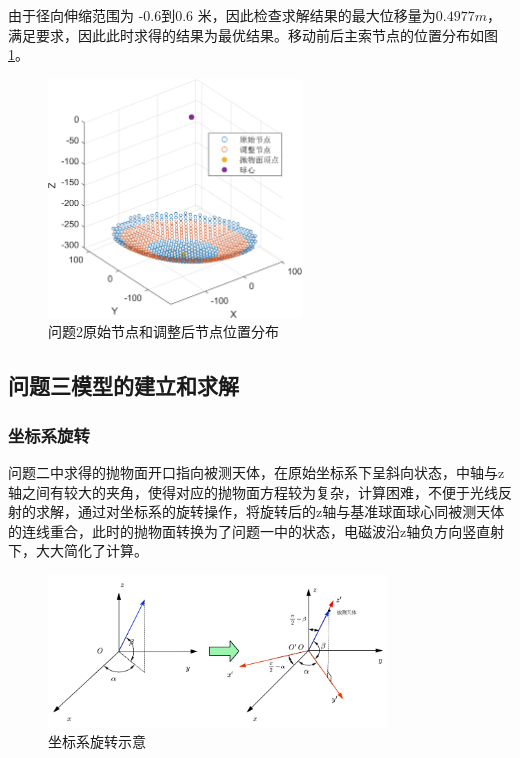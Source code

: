 \documentclass[withoutpreface,bwprint]{cumcmthesis} %
\begin{document}
	由于径向伸缩范围为 -0.6到0.6 米，因此检查求解结果的最大位移量为$0.4977m$，满足要求，因此此时求得的结果为最优结果。移动前后主索节点的位置分布如图\ref{问题2原始节点和调整后节点}。
	\begin{figure}[!htp]
		\centering
		\includegraphics[width=0.6\textwidth]{问题2原始节点和调整后节点}
		\caption{问题2原始节点和调整后节点位置分布}
		\label{问题2原始节点和调整后节点}
	\end{figure}
	
	\subsection{问题三模型的建立和求解}
	\subsubsection{坐标系旋转} 
	问题二中求得的抛物面开口指向被测天体，在原始坐标系下呈斜向状态，中轴与z轴之间有较大的夹角，使得对应的抛物面方程较为复杂，计算困难，不便于光线反射的求解，通过对坐标系的旋转操作，将旋转后的z轴与基准球面球心同被测天体的连线重合，此时的抛物面转换为了问题一中的状态，电磁波沿z轴负方向竖直射下，大大简化了计算。
	\begin{figure}[H]
		\centering
		\includegraphics[width=0.8\textwidth]{坐标系旋转示意.png}
		\caption{坐标系旋转示意}\label{坐标系旋转示意}
	\end{figure}
	
\end{document}
